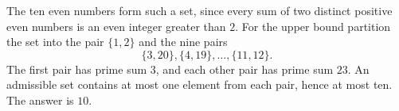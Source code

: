 The ten even numbers form such a set, since every sum of two distinct positive even numbers is an even integer greater than $2$. For the upper bound partition the set into the pair $\{1,2\}$ and the nine pairs
\[
\{3,20\},\{4,19\},\ldots,\{11,12\}.
\]
The first pair has prime sum $3$, and each other pair has prime sum $23$. An admissible set contains at most one element from each pair, hence at most ten. The answer is $\boxed{10}$.
